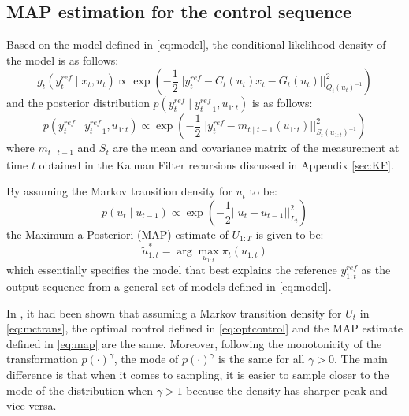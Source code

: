 \subsection{MAP estimation for the control sequence}
Based on the model defined in \eqref{eq:model}, the conditional likelihood density of the model is as follows:
\begin{equation}
  g_t(y^{ref}_t \mid x_t, u_t) \propto \exp\left( -\dfrac{1}{2} \vert\vert y^{ref}_t - C_t(u_t)x_t - G_t(u_t) \vert\vert^2_{Q_t(u_t)^{-1}}\right)
\end{equation}
and the posterior distribution $p(y^{ref}_t \mid y^{ref}_{t-1}, u_{1:t})$ is as follows:
\begin{equation}
  p(y^{ref}_t \mid y^{ref}_{t-1}, u_{1:t}) \propto \exp\left( -\dfrac{1}{2} \vert\vert y^{ref}_t - m_{t \mid t-1}(u_{1:t}) \vert\vert^2_{S_t(u_{1:t})^{-1}}\right)
\end{equation}
where $m_{t \mid t-1}$ and $S_t$ are the mean and covariance matrix of the measurement at time $t$ obtained in the Kalman Filter recursions discussed in Appendix \ref{sec:KF}.

By assuming the Markov transition density for $u_t$ to be:
\begin{equation}
  p(u_{t} \mid u_{t-1}) \propto  \exp\left( -\dfrac{1}{2} \vert\vert u_t - u_{t-1} \vert\vert^2_{L_t}\right)
\label{eq:mctrans}
\end{equation}
the Maximum a Posteriori (MAP) estimate of $U_{1:T}$ is given to be:
\begin{equation}
  \tilde{u}^*_{1:t} = \arg\max_{u_{1:t}} \pi_t(u_{1:t})
\label{eq:map}
\end{equation}
which essentially specifies the model that best explains the reference $y^{ref}_{1:t}$ as the output sequence from a general set of models defined in \eqref{eq:model}.

In \cite{NK11}, it had been shown that assuming a Markov transition density for $U_t$ in \eqref{eq:mctrans}, the optimal control defined in \eqref{eq:optcontrol} and the MAP estimate defined in \eqref{eq:map} are the same. Moreover, following the monotonicity of the transformation $p(\cdot)^\gamma$, the mode of $p(\cdot)^\gamma$ is the same for all $\gamma > 0$. The main difference is that when it comes to sampling, it is easier to sample closer to the mode of the distribution when $\gamma > 1$ because the density has sharper peak and vice versa.

